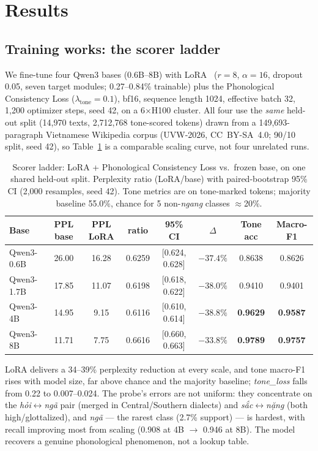 \documentclass[runningheads]{llncs}
\newcommand{\tone}[1]{\textit{#1}}
\begin{document}
\section{Results}
\label{sec:report}

\subsection{Training works: the scorer ladder}

We fine-tune four Qwen3 bases (0.6B--8B) with LoRA~\cite{hu2021lora} ($r{=}8$, $\alpha{=}16$, dropout 0.05, seven target modules; 0.27--0.84\% trainable) plus the Phonological Consistency Loss ($\lambda_{\text{tone}}{=}0.1$), bf16, sequence length 1024, effective batch 32, 1{,}200 optimizer steps, seed 42, on a 6$\times$H100 cluster. All four use the \emph{same} held-out split (14{,}970 texts, 2{,}712{,}768 tone-scored tokens) drawn from a 149{,}693-paragraph Vietnamese Wikipedia corpus (UVW-2026, CC~BY-SA~4.0; 90/10 split, seed 42), so Table~\ref{tab:ladder} is a comparable scaling curve, not four unrelated runs.

\begin{table}[H]
\centering
\caption{Scorer ladder: LoRA + Phonological Consistency Loss vs.\ frozen base, on one shared held-out split. Perplexity ratio (LoRA/base) with paired-bootstrap 95\% CI (2{,}000 resamples, seed 42). Tone metrics are on tone-marked tokens; majority baseline 55.0\%, chance for 5 non-\tone{ngang} classes $\approx$20\%.}
\label{tab:ladder}
\begin{tabular}{lccccccc}
\toprule
\textbf{Base} & \textbf{PPL base} & \textbf{PPL LoRA} & \textbf{ratio} & \textbf{95\% CI} & \textbf{$\Delta$} & \textbf{Tone acc} & \textbf{Macro-F1} \\
\midrule
Qwen3-0.6B & 26.00 & 16.28 & 0.6259 & [0.624, 0.628] & $-37.4\%$ & 0.8638 & 0.8626 \\
Qwen3-1.7B & 17.85 & 11.07 & 0.6198 & [0.618, 0.622] & $-38.0\%$ & 0.9410 & 0.9401 \\
Qwen3-4B   & 14.95 & 9.15  & 0.6116 & [0.610, 0.614] & $-38.8\%$ & \textbf{0.9629} & \textbf{0.9587} \\
Qwen3-8B   & 11.71 & 7.75  & 0.6616 & [0.660, 0.663] & $-33.8\%$ & \textbf{0.9789} & \textbf{0.9757} \\
\bottomrule
\end{tabular}
\end{table}

LoRA delivers a 34--39\% perplexity reduction at every scale, and tone macro-F1 rises with model size, far above chance and the majority baseline; \tone{tone\_loss} falls from 0.22 to 0.007--0.024. The probe's errors are not uniform: they concentrate on the \tone{hỏi}$\leftrightarrow$\tone{ngã} pair (merged in Central/Southern dialects) and \tone{sắc}$\leftrightarrow$\tone{nặng} (both high/glottalized), and \tone{ngã} --- the rarest class (2.7\% support) --- is hardest, with recall improving most from scaling (0.908 at 4B $\to$ 0.946 at 8B). The model recovers a genuine phonological phenomenon, not a lookup table.
\end{document}
